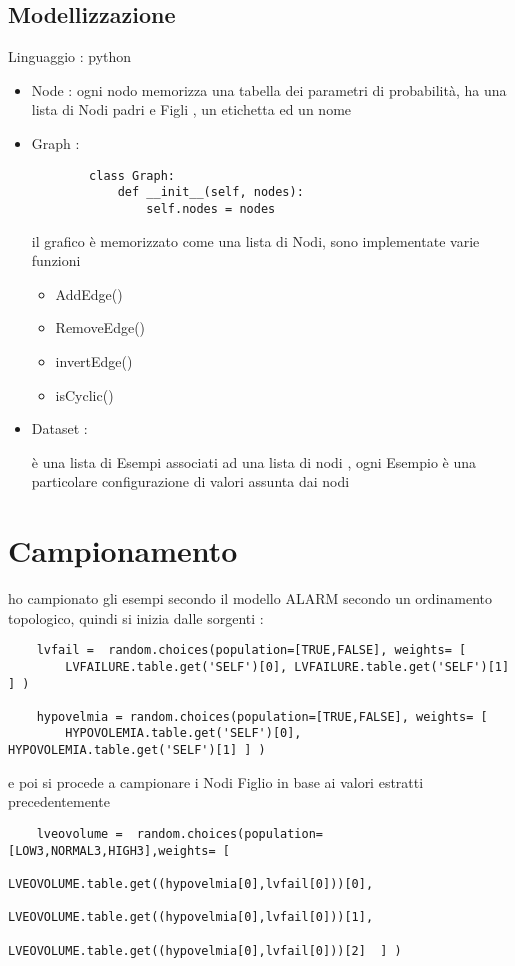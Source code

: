 \documentclass[12pt]{article}
\begin{document}
\subsection{ Modellizzazione }
Linguaggio : python 
\begin{itemize}
    \item Node : 
    ogni nodo memorizza una tabella dei parametri di probabilità, ha una lista di Nodi padri e Figli , 
    un etichetta ed un nome

    \item Graph :
    \begin{verbatim}
        class Graph:
            def __init__(self, nodes):
                self.nodes = nodes
    \end{verbatim}

    il grafico è memorizzato come una lista di Nodi, sono implementate varie funzioni 
    \begin{itemize}
        \item AddEdge()
        \item RemoveEdge()
        \item invertEdge()
        \item isCyclic()
    \end{itemize}

    \item Dataset : 
    
    è una lista di Esempi associati ad una lista di nodi , 
    ogni Esempio è una particolare configurazione di valori assunta dai nodi

\end{itemize}

    
\section { Campionamento }
    ho campionato gli esempi secondo  il modello ALARM secondo un ordinamento topologico, quindi si inizia dalle sorgenti : 
    \begin{verbatim}
    lvfail =  random.choices(population=[TRUE,FALSE], weights= [
        LVFAILURE.table.get('SELF')[0], LVFAILURE.table.get('SELF')[1] ] )
    
    hypovelmia = random.choices(population=[TRUE,FALSE], weights= [
        HYPOVOLEMIA.table.get('SELF')[0], HYPOVOLEMIA.table.get('SELF')[1] ] )
    \end{verbatim}
    e poi si procede a campionare i Nodi Figlio in base ai valori estratti precedentemente
    \begin{verbatim}
    lveovolume =  random.choices(population=[LOW3,NORMAL3,HIGH3],weights= [
                        LVEOVOLUME.table.get((hypovelmia[0],lvfail[0]))[0], 
                        LVEOVOLUME.table.get((hypovelmia[0],lvfail[0]))[1], 
                        LVEOVOLUME.table.get((hypovelmia[0],lvfail[0]))[2]  ] )
    \end{verbatim}
\end{document}
